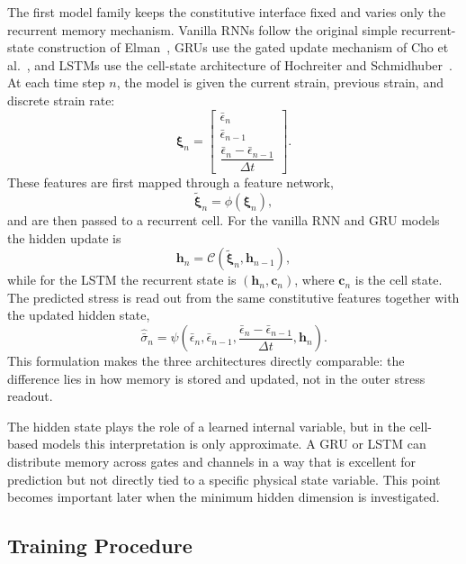 \documentclass[11pt,a4paper]{article}
\newcommand{\epsbar}{\bar{\epsilon}}
\newcommand{\sigbar}{\bar{\sigma}}
\newcommand{\dt}{\Delta t}
\begin{document}
The first model family keeps the constitutive interface fixed and varies only the recurrent memory mechanism. Vanilla RNNs follow the original simple recurrent-state construction of Elman~\cite{elman1990}, GRUs use the gated update mechanism of Cho et al.~\cite{cho2014}, and LSTMs use the cell-state architecture of Hochreiter and Schmidhuber~\cite{hochreiter1997}. At each time step $n$, the model is given the current strain, previous strain, and discrete strain rate:
\begin{equation}
\bm{\xi}_n=
\begin{bmatrix}
\epsbar_n\\
\epsbar_{n-1}\\
\dfrac{\epsbar_n-\epsbar_{n-1}}{\dt}
\end{bmatrix}.
\label{eq:step_features}
\end{equation}
These features are first mapped through a feature network,
\begin{equation}
\tilde{\bm{\xi}}_n=\phi(\bm{\xi}_n),
\label{eq:feature_network}
\end{equation}
and are then passed to a recurrent cell. For the vanilla RNN and GRU models the hidden update is
\begin{equation}
\bm{h}_n=\mathcal{C}\!\left(\tilde{\bm{\xi}}_n,\bm{h}_{n-1}\right),
\label{eq:cell_update}
\end{equation}
while for the LSTM the recurrent state is $(\bm{h}_n,\bm{c}_n)$, where $\bm{c}_n$ is the cell state. The predicted stress is read out from the same constitutive features together with the updated hidden state,
\begin{equation}
\hat{\sigbar}_n=\psi\!\left(\epsbar_n,\epsbar_{n-1},\frac{\epsbar_n-\epsbar_{n-1}}{\dt},\bm{h}_n\right).
\label{eq:cell_readout}
\end{equation}
This formulation makes the three architectures directly comparable: the difference lies in how memory is stored and updated, not in the outer stress readout.

The hidden state plays the role of a learned internal variable, but in the cell-based models this interpretation is only approximate. A GRU or LSTM can distribute memory across gates and channels in a way that is excellent for prediction but not directly tied to a specific physical state variable. This point becomes important later when the minimum hidden dimension is investigated.

\subsection{Training Procedure}
\end{document}
